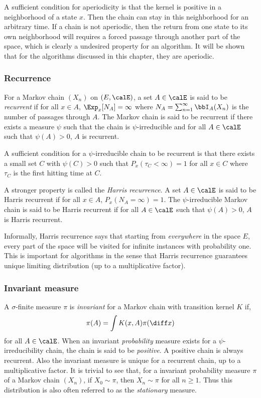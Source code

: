 A sufficient condition for aperiodicity is that the kernel is positive in a
neighborhood of a state $x$. Then the chain can stay in this neighborhood for
an arbitrary time. If a chain is not aperiodic, then the return from one state
to its own neighborhood will requires a forced passage through another part of
the space, which is clearly a undesired property for an \mcmc algorithm. It
will be shown that for the algorithms discussed in this chapter, they are
aperiodic.

\subsubsection{Recurrence}
\label{ssub:Recurrence}

For a Markov chain $(X_n)$ on $(E,\calE)$, a set $A\in\calE$ is said to be
\emph{recurrent} if for all $x\in A$, $\Exp_x[N_A] = \infty$ where $N_A =
\sum_{n=1}^{\infty}\bbI_A(X_n)$ is the number of passages through $A$. The
Markov chain is said to be recurrent if there exists a measure $\psi$ such
that the chain is $\psi$-irreducible and for all $A\in\calE$ such that
$\psi(A)>0$, $A$ is recurrent.

A sufficient condition for a $\psi$-irreducible chain to be recurrent is that
there exists a small set $C$ with $\psi(C)>0$ such that $P_x(\tau_C<\infty) =
1$ for all $x\in C$ where $\tau_C$ is the first hitting time at $C$.

A stronger property is called the \emph{Harris recurrence}. A set $A\in\calE$
is said to be Harris recurrent if for all $x\in A$, $P_x(N_A = \infty) = 1$.
The $\psi$-irreducible Markov chain is said to be Harris recurrent if for all
$A\in\calE$ such that $\psi(A)>0$, $A$ is Harris recurrent.

Informally, Harris recurrence says that starting from \emph{everywhere} in the
space $E$, every part of the space will be visited for infinite instances with
probability one. This is important for \mcmc algorithms in the sense that
Harris recurrence guarantees unique limiting distribution (up to a
multiplicative factor).

\subsubsection{Invariant measure}
\label{ssub:Invariant measure}


A $\sigma$-finite measure $\pi$ is \emph{invariant} for a Markov chain with
transition kernel $K$ if,
\begin{equation}
  \pi(A) = \int K(x,A)\pi(\diff x)
\end{equation}
for all $A\in\calE$. When an invariant \emph{probability} measure exists for a
$\psi$-irreducibility chain, the chain is said to be \emph{positive}. A
positive chain is always recurrent.  Also the invariant measure is unique for
a recurrent chain, up to a multiplicative factor. It is trivial to see that,
for a invariant probability measure $\pi$ of a Markov chain $(X_n)$, if
$X_0\sim\pi$, then $X_n\sim\pi$ for all $n\ge1$. Thus this distribution is
also often referred to as the \emph{stationary} measure.

